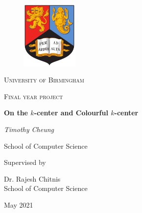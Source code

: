 \begin{titlepage}
    \setlength\headheight{90pt}
    \begin{center}
        \begin{figure}[h!]
            \centering
            \includegraphics[width=0.25\textwidth]{images/uob.png}
        \end{figure}
        
        \vspace{0.25cm}
            {\scshape\LARGE University of Birmingham \par}
            \vspace{0.25cm}
            {\scshape\Large Final year project\par}
        \vspace{0.5cm}
        
        \centering
        \Large{\textbf{On the $k$-center and Colourful $k$-center}}
        
        \vspace{1cm}
        \Large{\textit{Timothy Cheung}}
        
        \normalsize{School of Computer Science}
        
        \vspace{1cm}
        Supervised by\par
        Dr. Rajesh Chitnis \\
        School of Computer Science\par
        \vspace{1.5cm}
        
        \large{May 2021}
    \end{center}
\end{titlepage}
\newpage